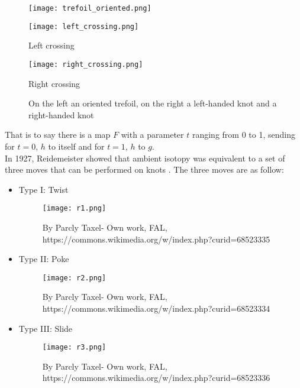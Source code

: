 \documentclass[12pt, a4paper]{article}
\begin{document}
\begin{figure}[H]
  \begin{minipage}[c]{.5\textwidth}
  \centering
  \texttt{[image: trefoil\_oriented.png]}    
  \end{minipage}
  \begin{minipage}[c]{.20\textwidth}
  \centering
  \texttt{[image: left\_crossing.png]}    
  \caption{Left crossing}
  \end{minipage}
  \begin{minipage}[c]{.20\textwidth}
  \centering
  \texttt{[image: right\_crossing.png]}    
  \caption{Right crossing}
  \end{minipage}
  \caption{On the left an oriented trefoil, on the right a left-handed knot and a right-handed knot}
  \label{fig:oriented_knot} 
\end{figure}

That is to say there is a map $F$ with a parameter $t$ ranging from 0 to 1, sending for $t=0$, $h$ to itself and for $t = 1$, $h$ to $g$.\\

In 1927, Reidemeister showed that ambient isotopy was equivalent to a set of three moves that can be performed on knots \cite{reidemeister_elementare_1927}. The three moves are as follow:

\begin{itemize}
    \item Type I: Twist
\begin{figure}[H]
             \centering
            \texttt{[image: r1.png]}
          \caption{By Parcly Taxel- Own work, FAL, https://commons.wikimedia.org/w/index.php?curid=68523335}
        \label{fig:r_1}
\end{figure}
    \item Type II: Poke
\begin{figure}[H]
             \centering
            \texttt{[image: r2.png]}
          \caption{By Parcly Taxel- Own work, FAL, https://commons.wikimedia.org/w/index.php?curid=68523334}
        \label{fig:r_2}
\end{figure}
    \item Type III: Slide 
\begin{figure}[H]
             \centering
            \texttt{[image: r3.png]}
          \caption{By Parcly Taxel- Own work, FAL, https://commons.wikimedia.org/w/index.php?curid=68523336}
        \label{fig:r_3}
\end{figure}
  \end{itemize}
\end{document}
